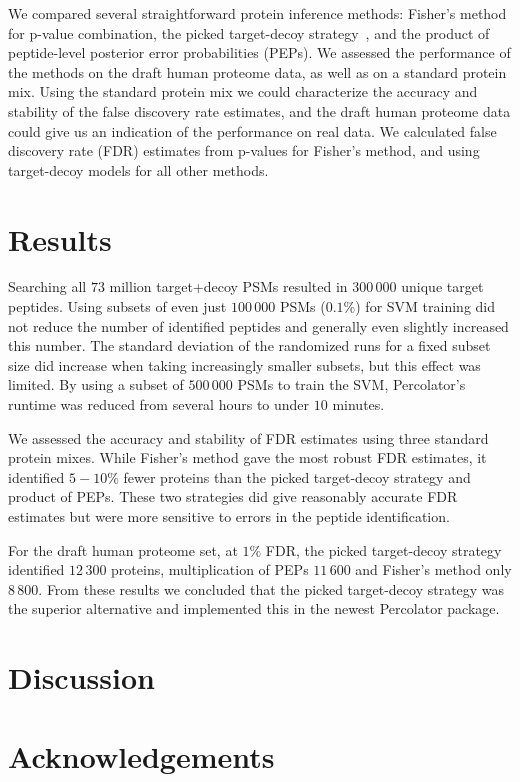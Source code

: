 \documentclass{article}
\begin{document}
We compared several straightforward protein inference methods:
Fisher’s method for p-value combination, the picked target-decoy
strategy~\cite{savitski2015scalable}, and the product of peptide-level
posterior error probabilities (PEPs). We assessed the performance of
the methods on the draft human proteome data, as well as on a standard
protein mix. Using the standard protein mix we could characterize the
accuracy and stability of the false discovery rate estimates, and the
draft human proteome data could give us an indication of the
performance on real data. We calculated false discovery rate (FDR)
estimates from p-values for Fisher’s method, and using target-decoy
models for all other methods.

\section*{Results}

Searching all $73$ million target+decoy PSMs resulted in $300\,000$
unique target peptides. Using subsets of even just $100\,000$ PSMs
($0.1\%$) for SVM training did not reduce the number of identified
peptides and generally even slightly increased this number. The
standard deviation of the randomized runs for a fixed subset size did
increase when taking increasingly smaller subsets, but this effect was
limited. By using a subset of $500\,000$ PSMs to train the SVM,
Percolator’s runtime was reduced from several hours to under $10$
minutes.

We assessed the accuracy and stability of FDR estimates using three
standard protein mixes. While Fisher’s method gave the most robust FDR
estimates, it identified $5-10\%$ fewer proteins than the picked
target-decoy strategy and product of PEPs. These two strategies did
give reasonably accurate FDR estimates but were more sensitive to
errors in the peptide identification. 

For the draft human proteome set, at $1\%$ FDR, the picked
target-decoy strategy identified $12\,300$ proteins, multiplication of
PEPs $11\,600$ and Fisher’s method only $8\,800$. From these results
we concluded that the picked target-decoy strategy was the superior
alternative and implemented this in the newest Percolator package.

\section*{Discussion}


\section*{Acknowledgements}


{} 

\end{document}
